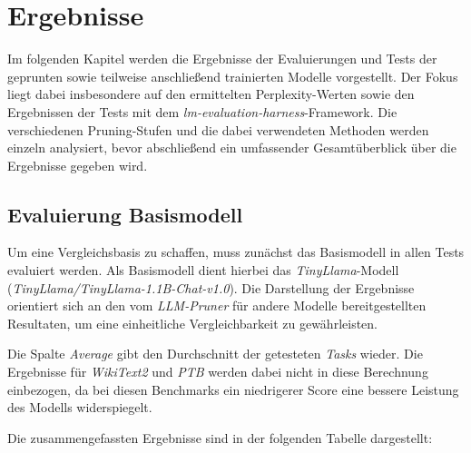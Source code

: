 \section{Ergebnisse}\label{ergebnisse}

Im folgenden Kapitel werden die Ergebnisse der Evaluierungen und Tests der
geprunten sowie teilweise anschließend trainierten Modelle vorgestellt. Der
Fokus liegt dabei insbesondere auf den ermittelten Perplexity-Werten sowie den
Ergebnissen der Tests mit dem \emph{lm-evaluation-harness}-Framework. Die
verschiedenen Pruning-Stufen und die dabei verwendeten Methoden werden einzeln
analysiert, bevor abschließend ein umfassender Gesamtüberblick über die
Ergebnisse gegeben wird.

\subsection{Evaluierung Basismodell}\label{evaluation-basemodel}

Um eine Vergleichsbasis zu schaffen, muss zunächst das Basismodell in allen
Tests evaluiert werden. Als Basismodell dient hierbei das
\emph{TinyLlama}-Modell (\emph{TinyLlama/TinyLlama-1.1B-Chat-v1.0}). Die
Darstellung der Ergebnisse orientiert sich an den vom \emph{LLM-Pruner} für
andere Modelle bereitgestellten Resultaten, um eine einheitliche
Vergleichbarkeit zu gewährleisten.

Die Spalte \emph{Average} gibt den Durchschnitt der getesteten \emph{Tasks}
wieder. Die Ergebnisse für \emph{WikiText2} und \emph{PTB} werden dabei nicht in
diese Berechnung einbezogen, da bei diesen Benchmarks ein niedrigerer Score eine
bessere Leistung des Modells widerspiegelt.

Die zusammengefassten Ergebnisse sind in der folgenden Tabelle dargestellt:

\begin{table}[h]
	\centering
	\caption{Evaluierung des Basismodells}
	\label{tab:pruning}
\end{table}

